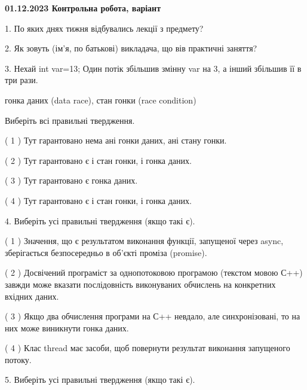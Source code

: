 \documentclass[12pt, ukrainian]{article}
\begin{document}
\vspace{4mm}
\newpage
\begin {large}

\textbf{01.12.2023 Контрольна робота, варіант  }\par


{
1. По яких днях тижня відбувались лекції з предмету?



\vspace{5mm}
2. Як зовуть (ім'я, по батькові) викладача, що вів практичні заняття?



\vspace{5mm}
3. Нехай int var=13; Один потік збільшив змінну var на 3, а інший збільшив її в три рази.

гонка даних (data race), стан гонки (race condition)

Виберіть всі правильні твердження.\par
\vspace{2mm}
( 1 ) Тут гарантовано нема ані гонки даних, ані стану гонки.%

( 2 ) Тут гарантовано є і стан гонки, і гонка даних.%

( 3 ) Тут гарантовано є гонка даних.%

( 4 ) Тут гарантовано є і стан гонки, і гонка даних.%


\vspace{5mm}
4. Виберіть усі правильні твердження (якщо такі є).\par
\vspace{2mm}

( 1 ) Значення, що є результатом виконання функції, запущеної через async, зберігається безпосередньо в об’єкті проміза (promise).%

( 2 ) Досвічений програміст за однопотоковою програмою (текстом мовою С++) завжди може вказати послідовність виконуваних обчислень на конкретних вхідних даних.%

( 3 ) Якщо два обчислення програми на С++ невдало, але синхронізовані, то на них може виникнути гонка даних.%

( 4 ) Клас thread має засоби, щоб повернути результат виконання запущеного потоку.%


\vspace{5mm}
5. Виберіть усі правильні твердження (якщо такі є).\par
\vspace{2mm}

}
\end{large}
\end{document}
